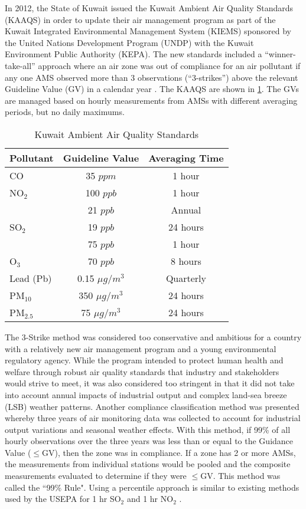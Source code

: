 In 2012, the State of Kuwait issued the Kuwait Ambient Air Quality Standards (KAAQS) in order to update their air management program as part of the Kuwait Integrated Environmental Management System (KIEMS) sponsored by the United Nations Development Program (UNDP) with the Kuwait Environment Public Authority (KEPA). The new standards included a ``winner-take-all'' approach where an air zone was out of compliance for an air pollutant if any one AMS observed more than 3 observations (``3-strikes'') above the relevant Guideline Value (GV) in a calendar year \citep{KEPA2017}. The KAAQS are shown in \ref{tb:1kaaqs}. The GVs are managed based on hourly measurements from AMSs with different averaging periods, but no daily maximums.
%
\begin{table}[H]
\centering
\caption{Kuwait Ambient Air Quality Standards}
\label{tb:1kaaqs}
\begin{tabular}{@{}lcc@{}}
\toprule
\textbf{Pollutant} & \textbf{Guideline Value} & \textbf{Averaging Time} \\ \midrule
CO & 35 $ppm$ & 1 hour \\
NO$_{2}$ & 100 $ppb$ & 1 hour \\
 & 21 $ppb$ & Annual \\
SO$_{2}$ & 19 $ppb$ & 24 hours \\
 & 75 $ppb$ & 1 hour \\
O$_{3}$ & 70 $ppb$ & 8 hours \\
Lead (Pb) & 0.15 $\mu g/m^{3}$ & Quarterly \\
PM$_{10}$ & 350 $\mu g/m^{3}$ & 24 hours \\
PM$_{2.5}$ & 75 $\mu g/m^{3}$ & 24 hours \\ \bottomrule
\end{tabular}
\end{table}
%
The 3-Strike method was considered too conservative and ambitious for a country with a relatively new air management program and a young environmental regulatory agency. While the program intended to protect human health and welfare through robust air quality standards that industry and stakeholders would strive to meet, it was also considered too stringent in that it did not take into account annual impacts of industrial output and complex land-sea breeze (LSB) weather patterns. Another compliance classification method was presented whereby three years of air monitoring data was collected to account for industrial output variations and seasonal weather effects. With this method, if 99\% of all hourly observations over the three years was less than or equal to the Guidance Value ($\leq$GV), then the zone was in compliance. If a zone has 2 or more AMSs, the measurements from individual stations would be pooled and the composite measurements evaluated to determine if they were $\leq$GV. This method was called the ``99\% Rule". Using a percentile approach is similar to existing methods used by the USEPA for 1 hr SO$_{2}$ and 1 hr NO$_{2}$ \citep{USEPA2016a}.
\clearpage
